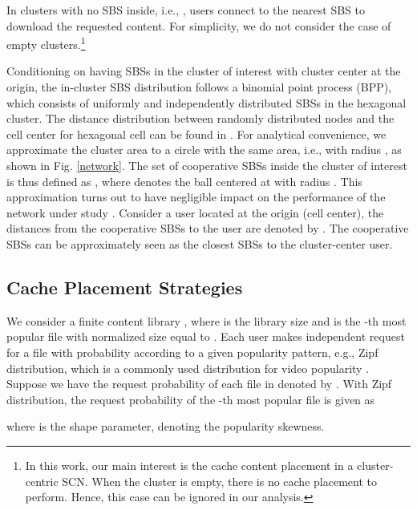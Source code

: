 \documentclass[twocolumns,10pt]{IEEEtran}
\begin{document}
In clusters with no SBS inside, i.e., , users connect to the nearest SBS to download the requested content. For simplicity, we do not consider the case of empty clusters.\footnote{In this work, our main interest is the cache content placement in a cluster-centric SCN. When the cluster is empty, there is no cache placement to perform. Hence, this case can be ignored in our analysis.}

Conditioning on having  SBSs in the cluster of interest with cluster center  at the origin, the in-cluster SBS distribution follows a binomial point process (BPP), which consists of  uniformly and independently distributed SBSs in the hexagonal cluster. The distance distribution between randomly distributed nodes and the cell center for hexagonal cell can be found in \cite{hexagon_pdf}. For analytical convenience, we approximate the cluster area to a circle with the same area, i.e., with radius , as shown in Fig. \ref{network}. The set of cooperative SBSs inside the cluster of interest is thus defined as , where  denotes the ball centered at  with radius . This approximation turns out to have negligible impact on the performance of the network under study \cite{hexagon_pdf}. Consider a user located at the origin (cell center), the distances from the cooperative SBSs to the user are denoted by . The  cooperative SBSs can be approximately seen as the  closest SBSs to the cluster-center user.



\subsection{Cache Placement Strategies}
We consider a finite content library , where  is the library size and  is the -th most popular file with normalized size equal to . Each user makes independent request for a file with probability according to a given popularity pattern, e.g., Zipf distribution, which is a commonly used distribution for video popularity \cite{zipf}. Suppose we have the request probability of each file in  denoted by .
With Zipf distribution, the request probability of the -th most popular file is given as

where  is the shape parameter, denoting the popularity skewness. 
\end{document}
